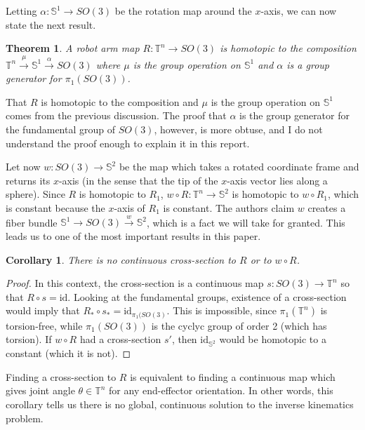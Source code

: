 \documentclass[12pt]{article}
\newtheorem{thm}{Theorem}
\newtheorem*{cor}{Corollary}
\theoremstyle{definition}
\begin{document}
Letting \(\alpha : \mathbb{S}^1 \rightarrow SO(3)\) be the rotation map around
the \(x\)-axis, we can now state the next result.
\begin{thm}
    A robot arm map \(R : \mathbb{T}^n \rightarrow SO(3)\) is homotopic to 
    the composition 
    \(\mathbb{T}^n \xrightarrow{\mu} \mathbb{S}^1 \xrightarrow{\alpha} SO(3)\)
    where \(\mu\) is the group operation on \(\mathbb{S}^1\) and \(\alpha\) is a
    group generator for \(\pi_1\left(SO(3)\right)\).
\end{thm}

That \(R\) is homotopic to the composition and \(\mu\) is the group operation on
\(\mathbb{S}^1\) comes from the previous discussion. The proof that \(\alpha\)
is the group generator for the fundamental group of \(SO(3)\), however, is more
obtuse, and I do not understand the proof enough to explain it in this report. 

Let now \(w : SO(3) \rightarrow \mathbb{S}^2\) be the map which takes a rotated
coordinate frame and returns its \(x\)-axis (in the sense that the tip of the
\(x\)-axis vector lies along a sphere).
Since \(R\) is homotopic to \(R_1\), 
\(w \circ R : \mathbb{T}^n \rightarrow \mathbb{S}^2\) is homotopic to 
\(w \circ R_1\), which is constant because the \(x\)-axis of \(R_1\) is
constant. The authors claim \(w\) creates a fiber bundle 
\(\mathbb{S}^1 \rightarrow SO(3) \xrightarrow{w} \mathbb{S}^2\), which is a fact
we will take for granted. This leads us to one of the most important results in
this paper.

\begin{cor}
    There is no continuous cross-section to \(R\) or to \(w \circ R\).
\end{cor}
\begin{proof}
    In this context, the cross-section is a continuous map 
    \(s : SO(3) \rightarrow \mathbb{T}^n\) so that \(R \circ s = \text{id}\). 
    Looking at the fundamental groups, existence of a cross-section would imply
    that \(R_* \circ s_* = \text{id}_{\pi_1(SO(3)}\). This is impossible, since
    \(\pi_1(\mathbb{T}^n)\) is torsion-free, while
    \(\pi_1(SO(3))\) is the cyclyc group of order 2 (which has torsion). 
    If \(w \circ R\) had a cross-section \(s'\), then \(\text{id}_{\mathbb{S}^2}\)
    would be homotopic to a constant (which it is not).
\end{proof}

Finding a cross-section to \(R\) is equivalent to finding a continuous map which
gives joint angle \(\theta \in \mathbb{T}^n\) for any end-effector orientation.
In other words, this corollary tells us there is no global, continuous solution
to the inverse kinematics problem.
\end{document}
